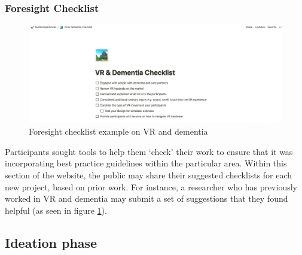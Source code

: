 \subsubsection{Foresight Checklist}
\begin{figure}[h]
\centering
\includegraphics[width=1\linewidth]{Images/D3Toolkit/Fig7.png}
\caption{Foresight checklist example on VR and dementia}
\label{fig:ForesightChecklist}
\end{figure}
Participants sought tools to help them `check' their work to ensure that it was incorporating best practice guidelines within the particular area. Within this section of the website, the public may share their suggested checklists for each new project, based on prior work. For instance, a researcher who has previously worked in VR and dementia may submit a set of suggestions that they found helpful (as seen in figure \ref{fig:ForesightChecklist}).

\subsection{Ideation phase}
